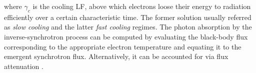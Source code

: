 %
where $\gamma_c$ is the cooling \ac{LF}, above which electrons loose their 
energy to radiation efficiently over a certain characteristic time.
%
The former solution usually referred as \textit{slow cooling} and the latter
\textit{fast cooling} regimes.
%
%
%
The photon absorption by the inverse-synchrotron process can be computed by evaluating 
the black-body flux corresponding to the appropriate electron temperature 
and equating it to the emergent synchrotron flux. Alternatively, it can be accounted for 
via flux attenuation \citep{Dermer:2009}.
%

